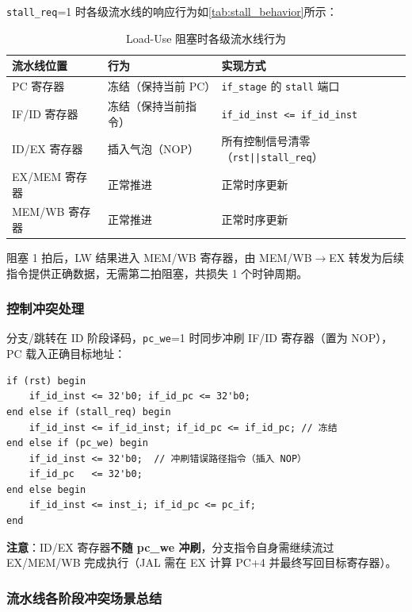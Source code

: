 \documentclass[12pt,hyperref,a4paper,UTF8]{ctexart}
\begin{document}
\texttt{stall\_req}=1 时各级流水线的响应行为如\autoref{tab:stall_behavior}所示：

\begin{table}[H]
    \centering
    \caption{Load-Use 阻塞时各级流水线行为}
    \label{tab:stall_behavior}
    \begin{tabular}{lll}
        \toprule
        流水线位置 & 行为 & 实现方式 \\
        \midrule
        PC 寄存器 & 冻结（保持当前 PC） & \texttt{if\_stage} 的 \texttt{stall} 端口 \\
        IF/ID 寄存器 & 冻结（保持当前指令） & \texttt{if\_id\_inst <= if\_id\_inst} \\
        ID/EX 寄存器 & 插入气泡（NOP） & 所有控制信号清零（\texttt{rst||stall\_req}） \\
        EX/MEM 寄存器 & 正常推进 & 正常时序更新 \\
        MEM/WB 寄存器 & 正常推进 & 正常时序更新 \\
        \bottomrule
    \end{tabular}
\end{table}

阻塞 1 拍后，LW 结果进入 MEM/WB 寄存器，由 MEM/WB$\rightarrow$EX 转发为后续指令提供正确数据，无需第二拍阻塞，共损失 1 个时钟周期。

\subsubsection{控制冲突处理}

分支/跳转在 ID 阶段译码，\texttt{pc\_we}=1 时同步冲刷 IF/ID 寄存器（置为 NOP），PC 载入正确目标地址：

\begin{lstlisting}[caption={控制冲突冲刷逻辑（IF/ID 更新）}]
if (rst) begin
    if_id_inst <= 32'b0; if_id_pc <= 32'b0;
end else if (stall_req) begin
    if_id_inst <= if_id_inst; if_id_pc <= if_id_pc; // 冻结
end else if (pc_we) begin
    if_id_inst <= 32'b0;  // 冲刷错误路径指令（插入 NOP）
    if_id_pc   <= 32'b0;
end else begin
    if_id_inst <= inst_i; if_id_pc <= pc_if;
end
\end{lstlisting}

\textbf{注意}：ID/EX 寄存器\textbf{不随 pc\_we 冲刷}，分支指令自身需继续流过 EX/MEM/WB 完成执行（JAL 需在 EX 计算 PC+4 并最终写回目标寄存器）。

\subsubsection{流水线各阶段冲突场景总结}
\end{document}
